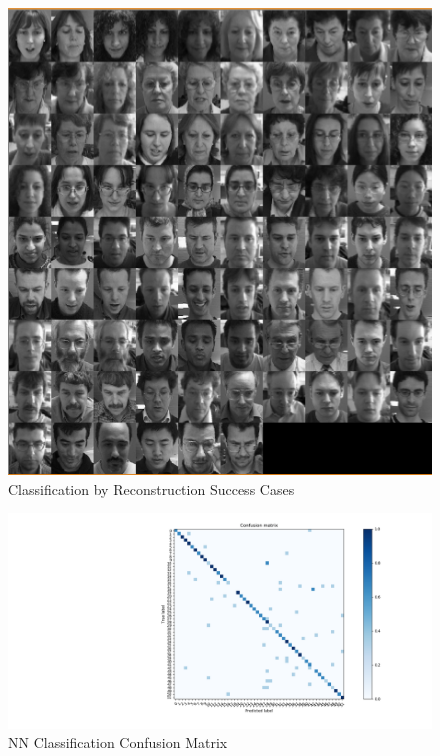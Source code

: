 \documentclass[10pt,technote]{IEEEtran}
\begin{document}
\begin{figure}
    \centering
    \includegraphics[width=\linewidth]{../results/1bb/REC_SUCCESS2.png}
    \caption{Classification by Reconstruction Success Cases}
    \label{fig:rec_successes}
\end{figure}

\begin{figure}
    \centering
    \includegraphics[width=\linewidth]{../results/1bb/confusion_NN.png}
    \caption{NN Classification Confusion Matrix}
    \label{fig:NN_conf_mat}
\end{figure}
\end{document}
